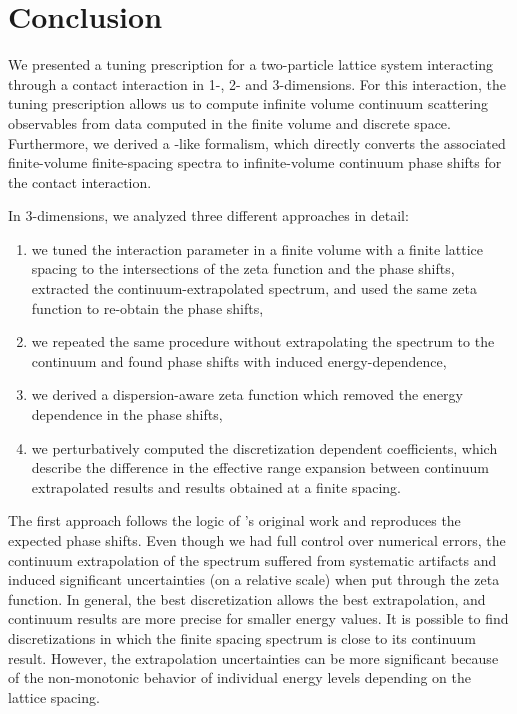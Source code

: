 \section{Conclusion}\label{sec:conclusion}
We presented a tuning prescription for a two-particle lattice system interacting through a contact interaction in 1-, 2- and 3-dimensions.
For this interaction, the tuning prescription allows us to compute infinite volume continuum scattering observables %
from data computed in the finite volume and discrete space.
Furthermore, we derived a \Luscher-like formalism, which directly converts the associated finite-volume finite-spacing spectra to infinite-volume continuum phase shifts for the contact interaction.

In 3-dimensions, we analyzed three different approaches in detail:
\begin{enumerate}
    \item we tuned the interaction parameter in a finite volume with a finite lattice spacing to the intersections of the \Luscher zeta function and the phase shifts, extracted the continuum-extrapolated spectrum, and used the same \Luscher zeta function to re-obtain the phase shifts,
    \item we repeated the same procedure without extrapolating the spectrum to the continuum and found phase shifts with induced energy-dependence,
    \item we derived a dispersion-aware zeta function which removed the energy dependence in the phase shifts,
    \item we perturbatively computed the discretization dependent coefficients, which describe the difference in the effective range expansion between continuum extrapolated results and results obtained at a finite spacing.
\end{enumerate}

The first approach follows the logic of \Luscher's original work and reproduces the expected phase shifts.
Even though we had full control over numerical errors, the continuum extrapolation of the spectrum suffered from systematic artifacts and induced significant uncertainties (on a relative scale) when put through the zeta function.
In general, the best discretization allows the best extrapolation, and continuum results are more precise for smaller energy values.
It is possible to find discretizations in which the finite spacing spectrum is close to its continuum result. However, the extrapolation uncertainties can be more significant because of the non-monotonic behavior of individual energy levels depending on the lattice spacing.

